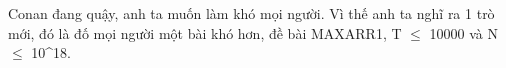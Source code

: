 Conan đang quậy, anh ta muốn làm khó mọi người. Vì thế anh ta nghĩ ra 1 trò mới, đó là đố mọi người một bài khó hơn, đề bài MAXARR1, T  $\le$  10000 và N  $\le$  10^18.  

\
